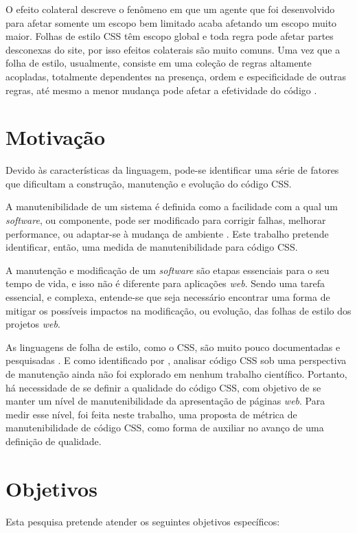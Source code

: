 O efeito colateral descreve o fenômeno em que um agente que foi desenvolvido para afetar somente um escopo bem limitado acaba afetando um escopo muito maior. Folhas de estilo CSS têm escopo global e toda regra pode afetar partes desconexas do site, por isso efeitos colaterais são muito comuns. Uma vez que a folha de estilo, usualmente, consiste em uma coleção de regras altamente acopladas, totalmente dependentes na presença, ordem e especificidade de outras regras, até mesmo a menor mudança pode afetar a efetividade do código \cite{Walton:2015}.

\section{Motivação}

Devido às características da linguagem, pode-se identificar uma série de fatores que dificultam a construção, manutenção e evolução do código CSS. 

A manutenibilidade de um sistema é definida como a facilidade com a qual um \textit{software}, ou componente, pode ser modificado para corrigir falhas, melhorar performance, ou adaptar-se à mudança de ambiente \cite{Ieee1990}. Este trabalho pretende identificar, então, uma medida de manutenibilidade para código CSS.

A manutenção e modificação de um \textit{software} são etapas essenciais para o seu tempo de vida, e isso não é diferente para aplicações \textit{web}. Sendo uma tarefa essencial, e complexa, entende-se que seja necessário encontrar uma forma de mitigar os possíveis impactos na modificação, ou evolução, das folhas de estilo dos projetos \textit{web}.

As linguagens de folha de estilo, como o CSS, são muito pouco documentadas e pesquisadas \cite{Marden1999,Quint2007,Geneves2012}. E como identificado por , analisar código CSS sob uma perspectiva de manutenção ainda não foi explorado em nenhum trabalho científico. Portanto, há necessidade de se definir a qualidade do código CSS, com objetivo de se manter um nível de manutenibilidade da apresentação de páginas \textit{web}. Para medir esse nível, foi feita neste trabalho, uma proposta de métrica de manutenibilidade de código CSS, como forma de auxiliar no avanço de uma definição de qualidade.

\section{Objetivos}
Esta pesquisa pretende atender os seguintes objetivos específicos:

